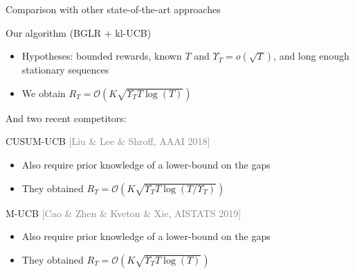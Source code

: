 \documentclass[11pt,english,ignorenonframetext,]{beamer}
\begin{document}
\begin{frame}{Comparison with other state-of-the-art approaches}

  \begin{exampleblock}{Our algorithm (BGLR + kl-UCB)}
    \begin{itemize}
      \item Hypotheses: bounded rewards, known $T$ and $\Upsilon_T = o(\sqrt{T})$, and long enough stationary sequences
      \item We obtain $R_T = \mathcal{O}(K \sqrt{\Upsilon_T T \log(T)})$
    \end{itemize}
  \end{exampleblock}

  \pause
  And two recent competitors:


  \begin{block}{CUSUM-UCB \hfill{} \textcolor{gray}{[Liu \& Lee \& Shroff, AAAI 2018]}}
    \begin{itemize}
      \item Also require \alert{prior knowledge of a lower-bound on the gaps}
      \item They obtained $R_T = \mathcal{O}(K \sqrt{\Upsilon_T T \log(T / \Upsilon_T)})$
    \end{itemize}
  \end{block}

  \begin{block}{M-UCB \hfill{} \textcolor{gray}{[Cao \& Zhen \& Kveton \& Xie, AISTATS 2019]}}
    \begin{itemize}
      \item Also require \alert{prior knowledge of a lower-bound on the gaps}
      \item They obtained $R_T = \mathcal{O}(K \sqrt{\Upsilon_T T \log(T)})$
    \end{itemize}
  \end{block}

\end{frame}
\end{document}
